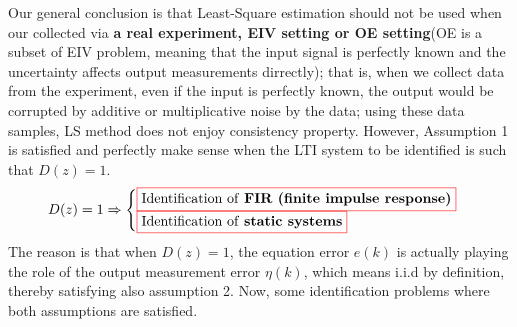 Our general conclusion is that Least-Square estimation should not be used when our collected via \textbf{a real experiment, EIV setting or OE setting}(OE is a subset of EIV problem, meaning that the input signal is perfectly known and the uncertainty affects output measurements dirrectly); that is, when we collect data from the experiment, even if the input is perfectly known, the output would be corrupted by additive or multiplicative noise by the data; using these data samples, LS method does not enjoy consistency property. However, Assumption 1 is satisfied and perfectly make sense when the LTI system to be identified is such that \(D(z) =  1\).\\
\[
D(z) = 1 \Rightarrow
\begin{cases}
\textcolor{red}{\fbox{\textcolor{black}{$
\text{Identification of \textbf{FIR (finite impulse response)}}
$}}}\\
\textcolor{red}{\fbox{\textcolor{black}{$\text{Identification of \textbf{static systems}}
$}}}
\end{cases}
\]
The reason is that when \(D(z) = 1\), the equation error \(e(k)\) is actually playing the role of the output measurement error \(\eta(k)\), which means i.i.d by definition, thereby satisfying also assumption 2. Now, some identification problems where both assumptions are satisfied.\\

